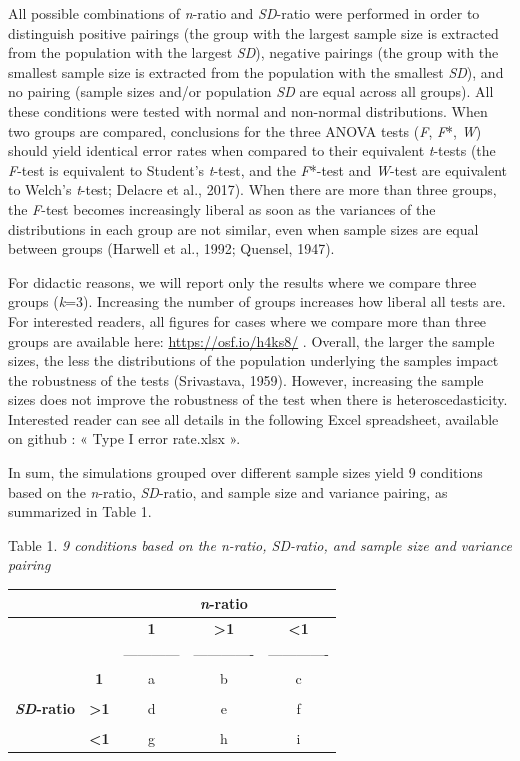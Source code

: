 \documentclass[man,floatsintext]{apa6}
\begin{document}
All possible combinations of \emph{n}-ratio and \emph{SD}-ratio were performed in order to distinguish positive pairings (the group with the largest sample size is extracted from the population with the largest \emph{SD}), negative pairings (the group with the smallest sample size is extracted from the population with the smallest \emph{SD}), and no pairing (sample sizes and/or population \emph{SD} are equal across all groups). All these conditions were tested with normal and non-normal distributions. When two groups are compared, conclusions for the three ANOVA tests (\emph{F}, \emph{F}*, \emph{W}) should yield identical error rates when compared to their equivalent \emph{t}-tests (the \emph{F}-test is equivalent to Student's \emph{t}-test, and the \emph{F}*-test and \emph{W}-test are equivalent to Welch's \emph{t}-test; Delacre et al., 2017). When there are more than three groups, the \emph{F}-test becomes increasingly liberal as soon as the variances of the distributions in each group are not similar, even when sample sizes are equal between groups (Harwell et al., 1992; Quensel, 1947).

For didactic reasons, we will report only the results where we compare three groups (\emph{k}=3). Increasing the number of groups increases how liberal all tests are. For interested readers, all figures for cases where we compare more than three groups are available here: \url{https://osf.io/h4ks8/} . Overall, the larger the sample sizes, the less the distributions of the population underlying the samples impact the robustness of the tests (Srivastava, 1959). However, increasing the sample sizes does not improve the robustness of the test when there is heteroscedasticity. Interested reader can see all details in the following Excel spreadsheet, available on github : « Type I error rate.xlsx ».

In sum, the simulations grouped over different sample sizes yield 9 conditions based on the \emph{n}-ratio, \emph{SD}-ratio, and sample size and variance pairing, as summarized in Table 1.

Table 1.
\emph{9 conditions based on the n-ratio, SD-ratio, and sample size and variance pairing}

\begin{longtable}[]{@{}ccccc@{}}
\toprule
& & & \textbf{\emph{n}-ratio} &\tabularnewline
\midrule
\endhead
& & \textbf{1} & \textbf{\textgreater{}1} & \textbf{\textless{}1}\tabularnewline
& & ------------ & ------------- & -------------\tabularnewline
& \textbf{1} & a & b & c\tabularnewline
& & & &\tabularnewline
\textbf{\emph{SD}-ratio} & \textbf{\textgreater{}1} & d & e & f\tabularnewline
& & & &\tabularnewline
& \textbf{\textless{}1} & g & h & i\tabularnewline
\bottomrule
\end{longtable}
\end{document}
